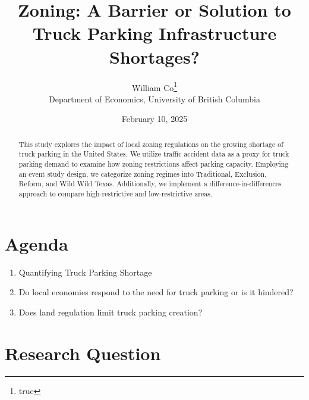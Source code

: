 \documentclass[
  12pt]{article}
\begin{document}
\def\spacingset#1{\renewcommand{\baselinestretch}%
{#1}\small\normalsize} \spacingset{1}



\date{February 10, 2025}
\title{\bf Zoning: A Barrier or Solution to Truck Parking Infrastructure
Shortages?}
\author{
William Co\thanks{true}\\
Department of Economics, University of British Columbia\\
}
\maketitle

\bigskip
\bigskip
\begin{abstract}
This study explores the impact of local zoning regulations on the
growing shortage of truck parking in the United States. We utilize
traffic accident data as a proxy for truck parking demand to examine how
zoning restrictions affect parking capacity. Employing an event study
design, we categorize zoning regimes into Traditional, Exclusion,
Reform, and Wild Wild Texas. Additionally, we implement a
difference-in-differences approach to compare high-restrictive and
low-restrictive areas.
\end{abstract}


\newpage
\spacingset{1.9} %
\ifdefined\Shaded\renewenvironment{Shaded}{\begin{tcolorbox}[boxrule=0pt, sharp corners, enhanced, interior hidden, frame hidden, borderline west={3pt}{0pt}{shadecolor}, breakable]}{\end{tcolorbox}}\fi

\hypertarget{agenda}{%
\section{Agenda}\label{agenda}}

\begin{enumerate}
\def\labelenumi{\arabic{enumi}.}
\item
  Quantifying Truck Parking Shortage
\item
  Do local economies respond to the need for truck parking or is it
  hindered?
\item
  Does land regulation limit truck parking creation?
\end{enumerate}

\hypertarget{research-question}{%
\section{Research Question}\label{research-question}}
\end{document}
